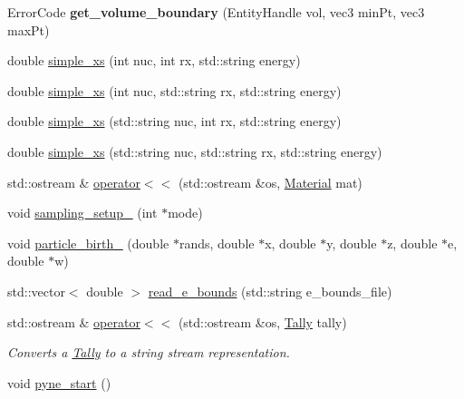 \begin{DoxyCompactItemize}
\item 
\hypertarget{namespacepyne_a41c879e6c635870307ab2a999e588429}{Error\+Code {\bfseries get\+\_\+volume\+\_\+boundary} (Entity\+Handle vol, vec3 min\+Pt, vec3 max\+Pt)}\label{namespacepyne_a41c879e6c635870307ab2a999e588429}

\item 
double \hyperlink{namespacepyne_abde9d0cbfe70fd1a75a7cb2d1f59e1f1}{simple\+\_\+xs} (int nuc, int rx, std\+::string energy)
\item 
double \hyperlink{namespacepyne_ab10ec6870a2330af652b07b4dc6dcb27}{simple\+\_\+xs} (int nuc, std\+::string rx, std\+::string energy)
\item 
double \hyperlink{namespacepyne_a5175275a09e97886dcf15a082a719812}{simple\+\_\+xs} (std\+::string nuc, int rx, std\+::string energy)
\item 
double \hyperlink{namespacepyne_ac9f173d7792a84eb558dc7396c7d4d56}{simple\+\_\+xs} (std\+::string nuc, std\+::string rx, std\+::string energy)
\item 
std\+::ostream \& \hyperlink{namespacepyne_a1241699bbd3224bb066190b7778dbd82}{operator$<$$<$} (std\+::ostream \&os, \hyperlink{classpyne_1_1_material}{Material} mat)
\item 
void \hyperlink{namespacepyne_a4b568e0d7793942733d5403116ddc00f}{sampling\+\_\+setup\+\_\+} (int $\ast$mode)
\item 
void \hyperlink{namespacepyne_ab6600e28064496661683a9c6ac4d5ec5}{particle\+\_\+birth\+\_\+} (double $\ast$rands, double $\ast$x, double $\ast$y, double $\ast$z, double $\ast$e, double $\ast$w)
\item 
std\+::vector$<$ double $>$ \hyperlink{namespacepyne_ab3863857f230598b1f05504671c2bafc}{read\+\_\+e\+\_\+bounds} (std\+::string e\+\_\+bounds\+\_\+file)
\item 
\hypertarget{namespacepyne_a6cd92dc1f5fb7e90e3d65c41b0b41f3c}{std\+::ostream \& \hyperlink{namespacepyne_a6cd92dc1f5fb7e90e3d65c41b0b41f3c}{operator$<$$<$} (std\+::ostream \&os, \hyperlink{classpyne_1_1_tally}{Tally} tally)}\label{namespacepyne_a6cd92dc1f5fb7e90e3d65c41b0b41f3c}

\begin{DoxyCompactList}\small\item\em Converts a \hyperlink{classpyne_1_1_tally}{Tally} to a string stream representation. \end{DoxyCompactList}\item 
\hypertarget{namespacepyne_a3b5ffed8eb26b84ae2a5af20aa205623}{void \hyperlink{namespacepyne_a3b5ffed8eb26b84ae2a5af20aa205623}{pyne\+\_\+start} ()}\label{namespacepyne_a3b5ffed8eb26b84ae2a5af20aa205623}


\end{DoxyCompactItemize}
